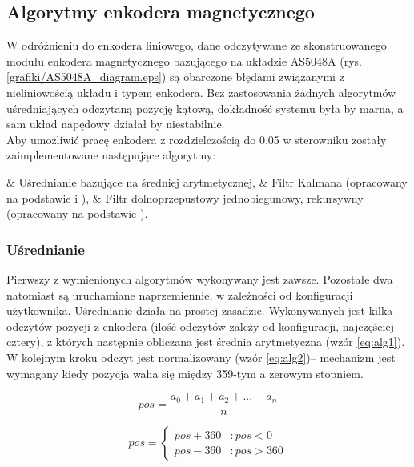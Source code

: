 \subsection{Algorytmy enkodera magnetycznego}
\label{ss:encalg}

W odróżnieniu do enkodera liniowego, dane odczytywane ze skonstruowanego modułu enkodera magnetycznego bazującego na układzie AS5048A (rys. \ref{grafiki/AS5048A_diagram.eps}) są obarczone błędami związanymi z nieliniowością układu i typem enkodera. Bez zastosowania żadnych algorytmów uśredniających odczytaną pozycję kątową, dokładność systemu była by marna, a sam układ napędowy działał by niestabilnie. \\

Aby umożliwić pracę enkodera z rozdzielczością do 0.05\degree{} w sterowniku zostały zaimplementowane następujące algorytmy:

\begin{easylist}
	& Uśrednianie bazujące na średniej arytmetycznej,
	& Filtr Kalmana (opracowany na podstawie \cite{kalman} i \cite{forbot}),
	& Filtr dolnoprzepustowy jednobiegunowy, rekursywny (opracowany na podstawie \cite{smith}).
	\\
\end{easylist} 

\subsubsection{Uśrednianie}

Pierwszy z wymienionych algorytmów wykonywany jest zawsze. Pozostałe dwa natomiast są uruchamiane naprzemiennie, w zależności od konfiguracji użytkownika. Uśrednianie działa na prostej zasadzie. Wykonywanych jest kilka odczytów pozycji z enkodera (ilość odczytów zależy od konfiguracji, najczęściej cztery), z których następnie obliczana jest średnia arytmetyczna (wzór \ref{eq:alg1}). W kolejnym kroku odczyt jest normalizowany (wzór \ref{eq:alg2})-- mechanizm jest wymagany kiedy pozycja waha się między 359-tym a zerowym stopniem.

\begin{equation} \label{eq:alg1}
	pos = \frac{a_0 + a_1 + a_2 + ... + a_n}{n} 
\end{equation}

\begin{equation} \label{eq:alg2}
pos = \left\{
  \begin{array}{ll}
    pos + 360 & : pos < 0 \\
    pos - 360 & : pos > 360
  \end{array}
\right.
\end{equation}

